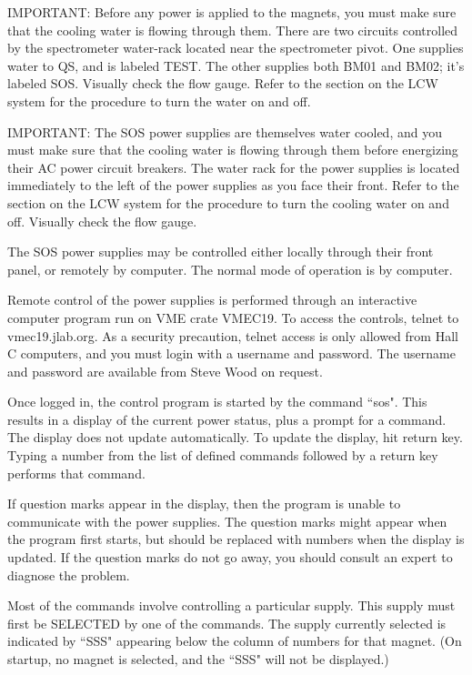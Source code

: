 IMPORTANT: Before any power is applied to the magnets, you must make sure that
the cooling water is flowing through them. There are two circuits controlled by
the spectrometer water-rack located near the spectrometer pivot. One supplies
water to QS, and is labeled TEST. The other supplies both BM01 and BM02; it's
labeled SOS. Visually check the flow gauge.
Refer to the section on the LCW system for the procedure to turn the water on and off.

IMPORTANT: The SOS power supplies are themselves water cooled, and you must
make sure that the cooling water is flowing through them before energizing
their AC power circuit breakers. The water rack for the power supplies is
located immediately to the left of the power supplies as you face their front.
Refer to the section on the LCW system for the procedure to turn the cooling water on and off.
Visually check the flow gauge.

The SOS power supplies may be controlled either locally through their front
panel, or remotely by computer. The normal mode of operation is by computer.

Remote control of the power supplies is performed through an interactive
computer program run on VME crate VMEC19. To access the controls, telnet to
vmec19.jlab.org. As a security precaution, telnet access is only allowed
from Hall C computers, and you must login with a username and
password.  The username and password are available
from Steve Wood on request.

Once logged in, the control program is started by the command ``sos".  This
results in a display of the current power status, plus a prompt for a
command. The display does not update automatically.  To update the
display, hit return key.  Typing a number from the list of defined
commands followed by a return key performs that command.

If question marks appear in the display, then the program is unable to
communicate with the power supplies. The question marks might appear when
the program first starts, but should be replaced with numbers when the
display is updated.  If the question marks do not go away, you should
consult an expert to diagnose the problem.

Most of the commands involve controlling a particular supply. This supply must
first be SELECTED by one of the commands. The supply currently selected is
indicated by ``SSS" appearing below the column of numbers for that magnet. (On
startup, no magnet is selected, and the ``SSS" will not be displayed.)

